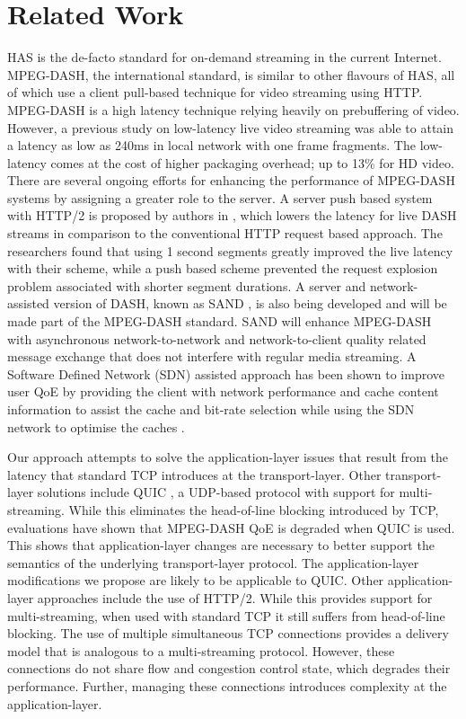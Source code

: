 \section{Related Work}
\label{sec:related}

HAS is the de-facto standard for on-demand streaming in the current Internet.
MPEG-DASH, the international standard, is similar to other flavours of HAS, all of which
use a client pull-based technique for video streaming using HTTP. MPEG-DASH is a high
latency technique relying heavily on prebuffering of video. However, a previous study on
low-latency live video streaming was able to attain a latency as low as 240ms in local
network with one frame fragments. The low-latency comes at the cost of higher packaging
overhead; up to 13\% for HD video. There are several ongoing efforts for enhancing the
performance of MPEG-DASH systems by assigning a greater role to the server. A server push
based system with HTTP/2 is proposed by authors in \cite{wei2014low}, which lowers the
latency for live DASH streams in comparison to the conventional HTTP request based
approach. The researchers found that using 1 second segments greatly improved the live
latency with their scheme, while a push based scheme prevented the request explosion
problem associated with shorter segment durations. A server and network-assisted version
of DASH, known as SAND \cite{thomas2015enhancing}, is also being developed and will be
made part of the MPEG-DASH standard. SAND will enhance MPEG-DASH with asynchronous
network-to-network and network-to-client quality related message exchange that does not
interfere with regular media streaming. A Software Defined Network (SDN) assisted approach
has been shown to improve user QoE by providing the client with network performance  and
cache content information to assist the cache and bit-rate selection while using the SDN
network to optimise the caches \cite{bhat2017network}.

Our approach attempts to solve the application-layer issues that result from the latency
that standard TCP introduces at the transport-layer. Other transport-layer solutions
include QUIC \cite{draft-ietf-quic-transport-latest}, a UDP-based protocol with support
for multi-streaming. While this eliminates the head-of-line blocking introduced by TCP,
evaluations \cite{bhat:2017:not-so-quic} have shown that MPEG-DASH QoE is degraded when
QUIC is used. This shows that application-layer changes are necessary to better support
the semantics of the underlying transport-layer protocol. The application-layer
modifications we propose are likely to be applicable to QUIC. Other application-layer
approaches include the use of HTTP/2. While this provides support for multi-streaming, when used with
standard TCP it still suffers from head-of-line blocking. The use of multiple simultaneous
TCP connections provides a delivery model that is analogous to a multi-streaming protocol.
However, these connections do not share flow and congestion control state, which degrades
their performance. Further, managing these connections introduces complexity at the
application-layer.

